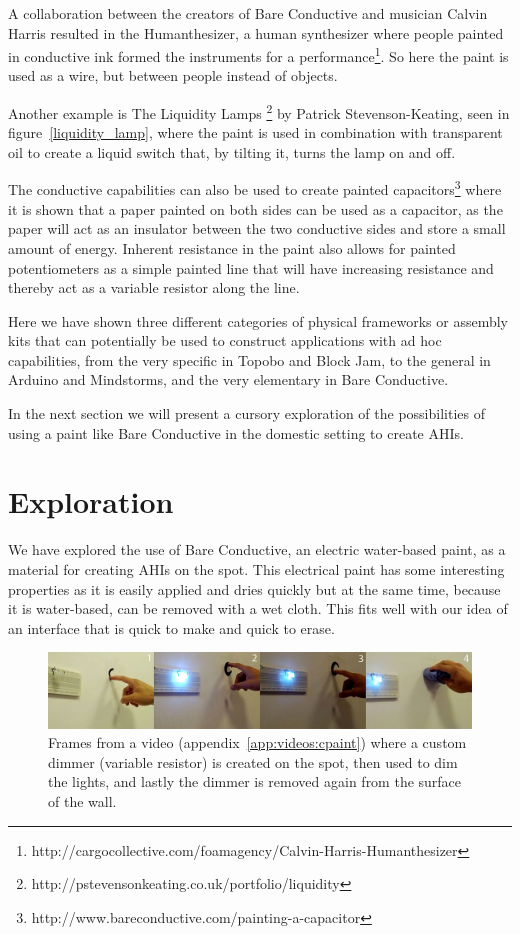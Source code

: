 A collaboration between the creators of Bare Conductive and musician Calvin Harris resulted in the Humanthesizer, a human synthesizer where people painted in conductive ink formed the instruments for a performance\footnote{http://cargocollective.com/foamagency/Calvin-Harris-Humanthesizer}.
So here the paint is used as a wire, but between people instead of objects.

Another example is The Liquidity Lamps \footnote{http://pstevensonkeating.co.uk/portfolio/liquidity} by Patrick Stevenson-Keating, seen in figure~\ref{liquidity_lamp}, where the paint is used in combination with transparent oil to create a liquid switch that, by tilting it, turns the lamp on and off.

The conductive capabilities can also be used to create painted capacitors\footnote{http://www.bareconductive.com/painting-a-capacitor} where it is shown that a paper painted on both sides can be used as a capacitor, as the paper will act as an insulator between the two conductive sides and store a small amount of energy.
Inherent resistance in the paint also allows for painted potentiometers as a simple painted line that will have increasing resistance and thereby act as a variable resistor along the line.

Here we have shown three different categories of physical frameworks or assembly kits that can potentially be used to construct applications with ad hoc capabilities, from the very specific in Topobo and Block Jam, to the general in Arduino and Mindstorms, and the very elementary in Bare Conductive.

In the next section we will present a cursory exploration of the possibilities of using a paint like Bare Conductive in the domestic setting to create AHIs.

\section{Exploration}
We have explored the use of Bare Conductive, an electric water-based paint, as a material for creating AHIs on the spot.
This electrical paint has some interesting properties as it is easily applied and dries quickly but at the same time, because it is water-based, can be removed with a wet cloth.
This fits well with our idea of an interface that is quick to make and quick to erase.

\begin{figure}[h]
  \centering
  \includegraphics[width=.9\textwidth]{figures/proto3/light-variable-res}
  \caption[Frames from custom dimmer, created on the spot]
  {Frames from a video (appendix~\ref{app:videos:cpaint}) where a custom dimmer (variable resistor) is created on the spot, then used to dim the lights, and lastly the dimmer is removed again from the surface of the wall.}
  \label{fig:ch:proto3:variable}
\end{figure}

